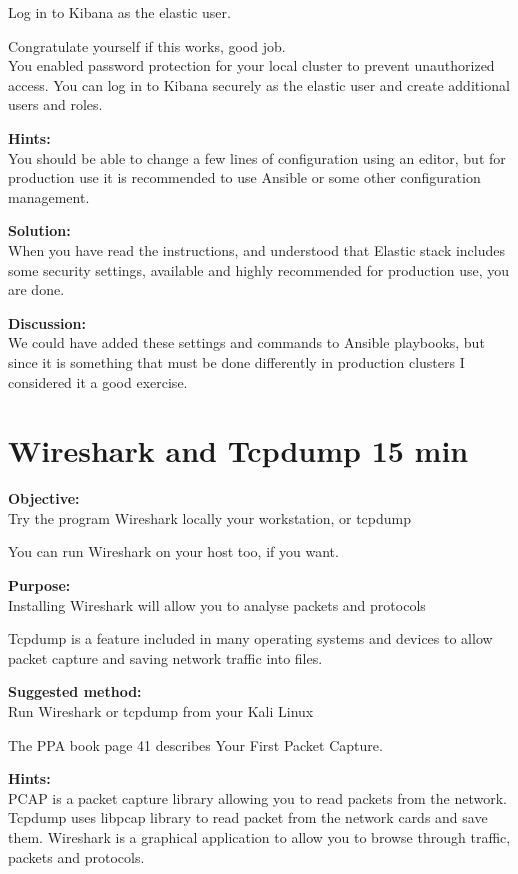 \documentclass[a4paper,11pt,notitlepage]{report}
\begin{document}
Log in to Kibana as the elastic user.


Congratulate yourself if this works, good job.\\
You enabled password protection for your local cluster to prevent unauthorized access. You can log in to Kibana securely as the elastic user and create additional users and roles.


{\bf Hints:}\\
You should be able to change a few lines of configuration using an editor, but for production use it is recommended to use Ansible or some other configuration management.

{\bf Solution:}\\
When you have read the instructions, and understood that Elastic stack includes some security settings, available and highly recommended for production use, you are done.

{\bf Discussion:}\\
We could have added these settings and commands to Ansible playbooks, but since it is something that must be done differently in production clusters I considered it a good exercise.


\chapter{Wireshark and Tcpdump 15 min}
\label{ex:wireshark-install}



{\bf Objective:}\\
Try the program Wireshark locally your workstation, or tcpdump

You can run Wireshark on your host too, if you want.

{\bf Purpose:}\\
Installing Wireshark will allow you to analyse packets and protocols

Tcpdump is a feature included in many operating systems and devices to allow packet capture and saving network traffic into files.

{\bf Suggested method:}\\
Run Wireshark or tcpdump from your Kali Linux

The PPA book page 41 describes Your First Packet Capture.

{\bf Hints:}\\
PCAP is a packet capture library allowing you to read packets from the network.
Tcpdump uses libpcap library to read packet from the network cards and save them.
Wireshark is a graphical application to allow you to browse through traffic, packets and protocols.
\end{document}
